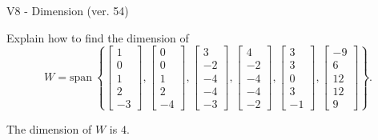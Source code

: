 \begin{exercise}
  \begin{exerciseTitle}V8 - Dimension (ver. 54)\end{exerciseTitle}
  \begin{exerciseStatement}
    Explain how to find the dimension of 
\[W=\mathrm{span}\ \left\{\left[\begin{array}{r}
1 \\
0 \\
1 \\
2 \\
-3
\end{array}\right] , \left[\begin{array}{r}
0 \\
0 \\
1 \\
2 \\
-4
\end{array}\right] , \left[\begin{array}{r}
3 \\
-2 \\
-4 \\
-4 \\
-3
\end{array}\right] , \left[\begin{array}{r}
4 \\
-2 \\
-4 \\
-4 \\
-2
\end{array}\right] , \left[\begin{array}{r}
3 \\
3 \\
0 \\
3 \\
-1
\end{array}\right] , \left[\begin{array}{r}
-9 \\
6 \\
12 \\
12 \\
9
\end{array}\right]\right\}.\]



  \end{exerciseStatement}
  \begin{exerciseAnswer}
   The dimension of \(W\) is  \(4\).
  


  \end{exerciseAnswer}
\end{exercise}
